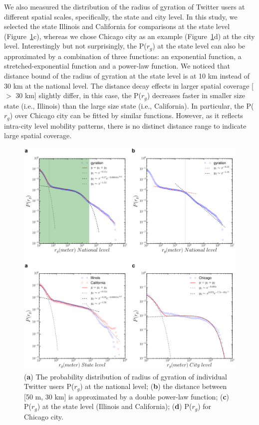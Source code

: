 \documentclass[ijgi,article,accept,moreauthors,pdftex,10pt,a4paper]{mdpi}
\theoremstyle{mdpi}
\newcounter{ex}
\newcounter{re}
\theoremstyle{mdpidefinition}
\begin{document}
We also measured the distribution of the radius of gyration of Twitter users at different spatial scales, specifically, the state and city level.
In this study, we selected the state Illinois and California for comparisons at the state level (Figure~\ref{fig:gyration}c), whereas we chose Chicago city as an example (Figure~\ref{fig:gyration}d) at the city level.
Interestingly but not surprisingly, the P($r_{g}$) at the state level can also be approximated by a combination of three functions: an exponential function, a stretched-exponential function and a power-law function.
We noticed that distance bound of the radius of gyration at the state level is at 10 km instead of 30 km at the national level.
The distance decay effects in larger spatial coverage [$>$ 30 km] slightly differ, in this case, the P($r_{g}$) decreases faster in smaller size state (i.e., Illinois) than the large size state (i.e., California).
In particular, the P($r_{g}$) over Chicago city can be fitted by similar functions.
However, as it reflects intra-city level mobility patterns, there is no distinct distance range to indicate large spatial coverage.

\begin{figure}[ht]
\centering
\includegraphics[width=1.0\linewidth]{./figures/gyration2}
\caption{ ({\bf a}) The probability distribution of radius of gyration of individual Twitter users P($r_{g}$) at the national level; ({\bf b}) the distance between [50 m, 30 km] is approximated by a double power-law function; ({\bf c}) P($r_{g}$) at the state level (Illinois and California); ({\bf d}) P($r_{g}$) for Chicago city.} 
\label{fig:gyration}
\end{figure}
\FloatBarrier
\end{document}
